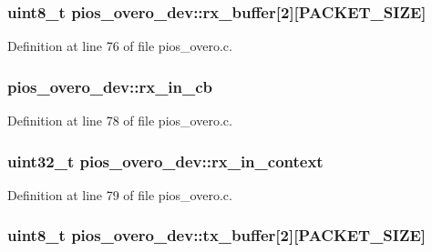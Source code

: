\hypertarget{structpios__overo__dev_a638ed3a9ebc43e2ce3477041a7f68a95}{
\subsubsection[{rx\-\_\-buffer}]{\setlength{\rightskip}{0pt plus 5cm}uint8\-\_\-t {\bf pios\-\_\-overo\-\_\-dev\-::rx\-\_\-buffer}\mbox{[}2\mbox{]}\mbox{[}\-P\-A\-C\-K\-E\-T\-\_\-\-S\-I\-Z\-E\mbox{]}}}\label{structpios__overo__dev_a638ed3a9ebc43e2ce3477041a7f68a95}


\-Definition at line 76 of file pios\-\_\-overo.\-c.

\hypertarget{structpios__overo__dev_acba008cacb6d3478462b4c681b60a158}{
\subsubsection[{rx\-\_\-in\-\_\-cb}]{ {\bf pios\-\_\-overo\-\_\-dev\-::rx\-\_\-in\-\_\-cb}}}\label{structpios__overo__dev_acba008cacb6d3478462b4c681b60a158}


\-Definition at line 78 of file pios\-\_\-overo.\-c.

\hypertarget{structpios__overo__dev_acd9b0fbbf1587d730b3a91eaeee52253}{
\subsubsection[{rx\-\_\-in\-\_\-context}]{\setlength{\rightskip}{0pt plus 5cm}uint32\-\_\-t {\bf pios\-\_\-overo\-\_\-dev\-::rx\-\_\-in\-\_\-context}}}\label{structpios__overo__dev_acd9b0fbbf1587d730b3a91eaeee52253}


\-Definition at line 79 of file pios\-\_\-overo.\-c.

\hypertarget{structpios__overo__dev_a48dfcb09b1a3c648ab7d1e2c79f4094e}{
\subsubsection[{tx\-\_\-buffer}]{\setlength{\rightskip}{0pt plus 5cm}uint8\-\_\-t {\bf pios\-\_\-overo\-\_\-dev\-::tx\-\_\-buffer}\mbox{[}2\mbox{]}\mbox{[}\-P\-A\-C\-K\-E\-T\-\_\-\-S\-I\-Z\-E\mbox{]}}}\label{structpios__overo__dev_a48dfcb09b1a3c648ab7d1e2c79f4094e}


